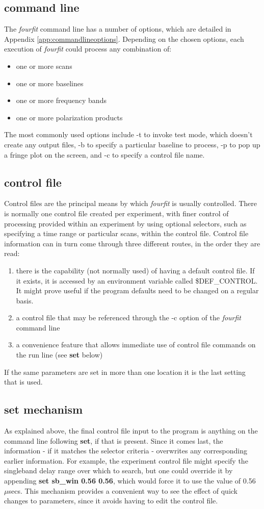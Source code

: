 \subsection{\textbf command line}
The \textit{fourfit} command line has a number of options, which are
detailed in Appendix \ref{app:commandlineoptions}. 
Depending on the chosen options, each execution of \textit{fourfit}
could process any combination of:
\begin{itemize}
\item one or more scans
\item one or more baselines
\item one or more frequency bands
\item one or more polarization products
\end{itemize}
The most commonly used options include -t to invoke test mode,
which doesn't create any output files, -b to specify a particular
baseline to process, -p to pop up a fringe plot on the screen,
and -c to specify a control file name.


\subsection{\textbf control file}
Control files are the principal means by which \textit{fourfit} is usually controlled.
There is normally one control file created per experiment, with finer control
of processing provided within an experiment by using optional selectors,
such as specifying a time range or particular scans,
within the control file. Control file information can in turn come through
three different routes, in the order they are read:
\begin{enumerate}
\item there is the capability (not normally used) of having
a default control file. If it exists, it is accessed by
an environment variable called \$DEF\_CONTROL. It might prove useful
if the program defaults need to be changed on a regular basis.
\item a control file that may be referenced
through the -c option of the \textit{fourfit} command line
\item a convenience feature that allows immediate use of control file commands
on the run line (see \textbf{set} below)
\end{enumerate}
If the same parameters are set in more than one location it is the last
setting that is used.

\subsection{\textbf{set} mechanism}
As explained above, the final control file input to the program
is anything on the command line following \textbf{set}, if that is present.
Since it comes last, the information - if it matches the selector
criteria - overwrites any corresponding earlier information. For example,
the experiment control file might specify the singleband delay range over
which to search, but one could override it by appending 
\textbf{set sb\_win 0.56 0.56}, which would force it to use the value of 
0.56 $\mu$secs. This mechanism provides a convenient way to see the
effect of quick changes to parameters, since it avoids having to edit
the control file.
